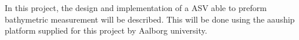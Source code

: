 %
In this project, the design and implementation of a ASV able to preform bathymetric measurement will be described. 
This will be done using the aauship platform supplied for this project by Aalborg university. 
